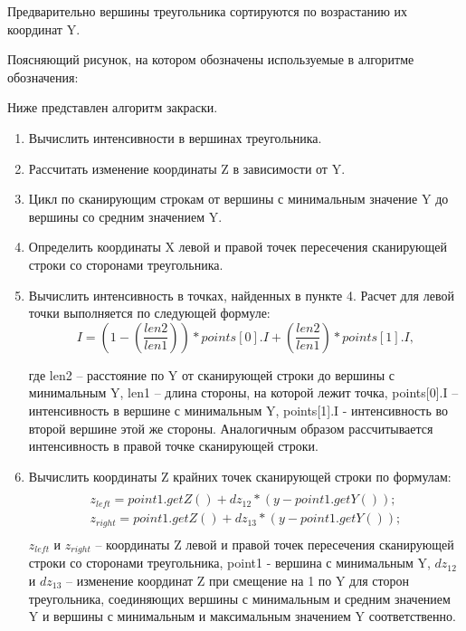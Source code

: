 Предварительно вершины треугольника сортируются по возрастанию их координат Y.

Поясняющий рисунок, на котором обозначены используемые в алгоритме обозначения:
\begin{figure}[ht!]
\end{figure}

Ниже представлен алгоритм закраски.

\begin{enumerate}
	\item Вычислить интенсивности в вершинах треугольника.
	\item Рассчитать изменение координаты Z в зависимости от Y.
	\item Цикл по сканирующим строкам от вершины с минимальным значение Y до вершины со средним значением Y.
	\item Определить координаты X левой и правой точек пересечения сканирующей строки со сторонами треугольника.
	\item Вычислить интенсивность в точках, найденных в пункте 4. Расчет для левой точки выполняется по следующей формуле: \begin{equation}
		I = (1 - (\frac{len2}{len1})) * points[0].I + (\frac{len2}{len1}) * points[1].I ,
	\end{equation} 
	
	где len2 – расстояние по Y от сканирующей строки до вершины с минимальным Y, len1 – длина стороны, на которой лежит точка, points[0].I – интенсивность в вершине с минимальным Y, points[1].I - интенсивность во второй вершине этой же стороны.
	Аналогичным образом рассчитывается интенсивность в правой точке сканирующей строки.
	\item Вычислить координаты Z крайних точек сканирующей строки по формулам: \begin{multline} \\
		z_{left} = point1.getZ() + dz_{12} * (y - point1.getY()); \\ 
		z_{right} = point1.getZ() + dz_{13} * (y - point1.getY()); \\
	\end{multline}
	$z_{left}$ и $z_{right}$ – координаты Z левой и правой точек пересечения сканирующей строки со сторонами треугольника, point1 - вершина с минимальным Y, $dz_{12}$ и $dz_{13}$ – изменение координат Z при смещение на 1 по Y для сторон треугольника, соединяющих вершины с минимальным и средним значением Y и вершины с минимальным и максимальным значением Y соответственно.


\end{enumerate}
